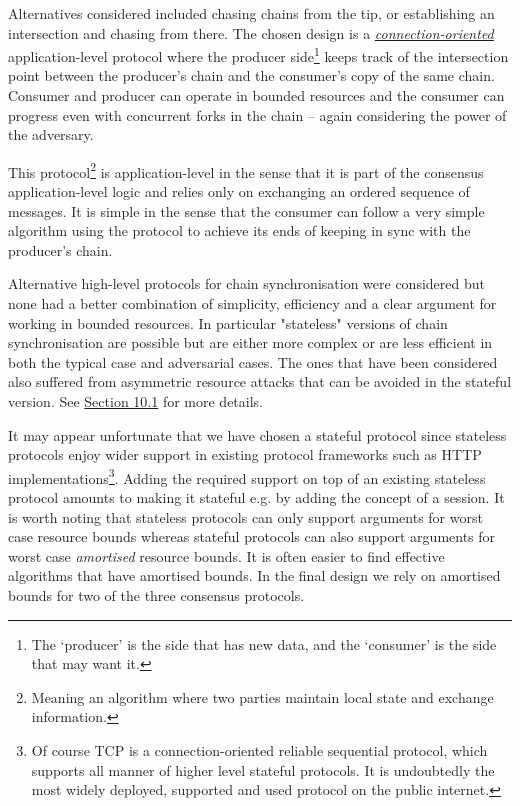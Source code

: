 \documentclass[11pt,a4paper]{article}
\begin{document}
Alternatives considered included chasing chains from the tip, or
establishing an intersection and chasing from there. The chosen design
is a
\emph{\href{https://en.wikipedia.org/wiki/Connection-oriented_communication}{{connection-oriented}}}
application-level protocol where the producer side\footnote{The
  `producer' is the side that has new data, and the `consumer' is the
  side that may want it.} keeps track of the intersection point between
the producer's chain and the consumer's copy of the same chain. Consumer
and producer can operate in bounded resources and the consumer can
progress even with concurrent forks in the chain -- again considering
the power of the adversary.

This protocol\footnote{Meaning an algorithm where two parties maintain
  local state and exchange information.} is application-level in the
sense that it is part of the consensus application-level logic and
relies only on exchanging an ordered sequence of messages. It is simple
in the sense that the consumer can follow a very simple algorithm using
the protocol to achieve its ends of keeping in sync with the producer's
chain.

Alternative high-level protocols for chain synchronisation were
considered but none had a better combination of simplicity, efficiency
and a clear argument for working in bounded resources. In particular
"stateless" versions of chain synchronisation are possible but are
either more complex or are less efficient in both the typical case and
adversarial cases. The ones that have been considered also suffered from
asymmetric resource attacks that can be avoided in the stateful version.
See \protect\hyperlink{stateful-implementation}{{Section 10.1}} for more
details.

It may appear unfortunate that we have chosen a stateful protocol since
stateless protocols enjoy wider support in existing protocol frameworks
such as HTTP implementations\footnote{Of course TCP is a
  connection-oriented reliable sequential protocol, which supports all
  manner of higher level stateful protocols. It is undoubtedly the most
  widely deployed, supported and used protocol on the public internet.}.
Adding the required support on top of an existing stateless protocol
amounts to making it stateful e.g. by adding the concept of a session.
It is worth noting that stateless protocols can only support arguments
for worst case resource bounds whereas stateful protocols can also
support arguments for worst case \emph{amortised} resource bounds. It is
often easier to find effective algorithms that have amortised bounds. In
the final design we rely on amortised bounds for two of the three
consensus protocols.
\end{document}
